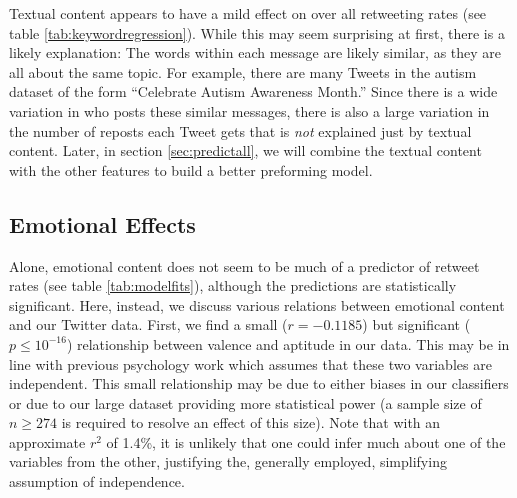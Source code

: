Textual content appears to have a mild effect on over all retweeting rates (see table \ref{tab:keywordregression}). While this may seem surprising at first, there is a likely explanation: The words within each message are likely similar, as they are all about the same topic. For example, there are many Tweets in the autism dataset of the form ``Celebrate Autism Awareness Month.'' Since there is a wide variation in who posts these similar messages, there is also a large variation in the number of reposts each Tweet gets that is \emph{not} explained just by textual content. Later, in section \ref{sec:predictall}, we will combine the textual content with the other features to build a better preforming model. 


\subsection{Emotional Effects}

Alone, emotional content does not seem to be much of a predictor of retweet rates (see table \ref{tab:modelfits}), although the predictions are statistically significant. Here, instead, we discuss various relations between emotional content and our Twitter data. First, we find a small (\(r = -0.1185\)) but significant (\(p \leq 10^{-16}\)) relationship between valence and aptitude in our data. This may be in line with previous psychology work which assumes that these two variables are independent.\cite{plutchik2001nature}  This small relationship may be due to either biases in our classifiers or due to our large dataset providing more statistical power (a sample size of \(n\geq 274\) is required to resolve an effect of this size). Note that with an approximate \(r^2\) of 1.4\%, it is unlikely that one could infer much about one of the variables from the other, justifying the, generally employed, simplifying assumption of independence.


